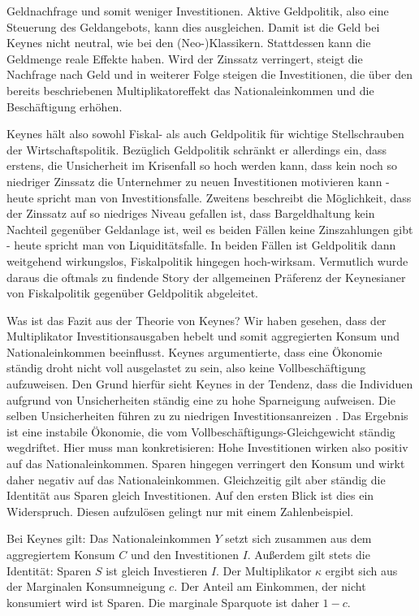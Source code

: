 Geldnachfrage und somit weniger Investitionen. Aktive Geldpolitik, also eine Steuerung des Geldangebots, kann dies ausgleichen. Damit ist die Geld bei Keynes nicht neutral, wie bei den (Neo-)Klassikern. Stattdessen kann die Geldmenge reale Effekte haben. Wird der Zinssatz verringert, steigt die Nachfrage nach Geld und in weiterer Folge steigen die Investitionen, die über den bereits beschriebenen Multiplikatoreffekt das Nationaleinkommen und die Beschäftigung erhöhen.

Keynes hält also sowohl Fiskal- als auch Geldpolitik für wichtige Stellschrauben der Wirtschaftspolitik. Bezüglich Geldpolitik schränkt er allerdings ein, dass erstens, die Unsicherheit im Krisenfall so hoch werden kann, dass kein noch so niedriger Zinssatz die Unternehmer zu neuen Investitionen motivieren kann \parencite[S. 208]{Keynes1936} - heute spricht man von Investitionsfalle. Zweitens beschreibt \textcite[S. 207]{Keynes1936} die Möglichkeit, dass der Zinssatz auf so niedriges Niveau gefallen ist, dass Bargeldhaltung kein Nachteil gegenüber Geldanlage ist, weil es beiden Fällen keine Zinszahlungen gibt - heute spricht man von Liquiditätsfalle. In beiden Fällen ist Geldpolitik dann weitgehend wirkungslos, Fiskalpolitik hingegen hoch-wirksam. Vermutlich wurde daraus die oftmals zu findende Story der allgemeinen Präferenz der Keynesianer von Fiskalpolitik gegenüber Geldpolitik abgeleitet.

Was ist das Fazit aus der Theorie von Keynes? Wir haben gesehen, dass der Multiplikator Investitionsausgaben hebelt und somit aggregierten Konsum und Nationaleinkommen beeinflusst. Keynes argumentierte, dass eine Ökonomie ständig droht nicht voll ausgelastet zu sein, also keine Vollbeschäftigung aufzuweisen. Den Grund hierfür sieht Keynes in der Tendenz, dass die Individuen aufgrund von Unsicherheiten ständig eine zu hohe Sparneigung aufweisen. Die selben Unsicherheiten führen zu zu niedrigen Investitionsanreizen \parencite[S. 63]{Snowdon2005}. Das Ergebnis ist eine instabile Ökonomie, die vom Vollbeschäftigungs-Gleichgewicht ständig wegdriftet. Hier muss man konkretisieren: Hohe Investitionen wirken also positiv auf das Nationaleinkommen. Sparen hingegen verringert den Konsum und wirkt daher negativ auf das Nationaleinkommen. Gleichzeitig gilt aber ständig die Identität aus Sparen gleich Investitionen. Auf den ersten Blick ist dies ein Widerspruch. Diesen aufzulösen gelingt nur mit einem Zahlenbeispiel.

Bei Keynes gilt: Das Nationaleinkommen $Y$ setzt sich zusammen aus dem aggregiertem Konsum $C$ und den Investitionen $I$. Außerdem gilt stets die Identität: Sparen $S$ ist gleich Investieren $I$. Der Multiplikator $\kappa$ ergibt sich aus der Marginalen Konsumneigung $c$. Der Anteil am Einkommen, der nicht konsumiert wird ist Sparen. Die marginale Sparquote ist daher $1-c$.

